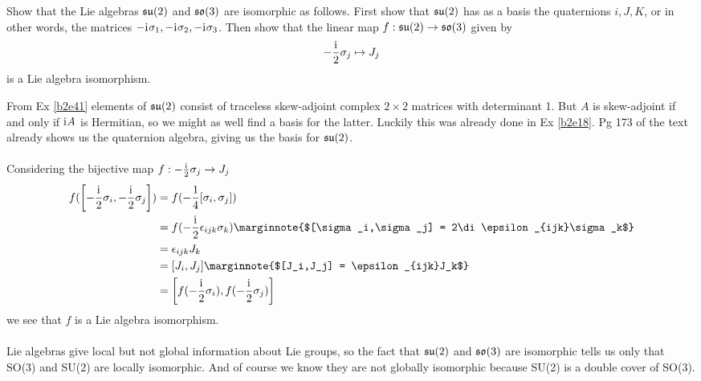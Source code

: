 \documentclass[10pt]{article}
\begin{document}
\begin{example}
	Show that the Lie algebras $\mathfrak{su}(2)$ and $\mathfrak{so}(3)$ are isomorphic as follows. First show that $\mathfrak{su}(2)$ has as a basis the quaternions $i,J,K$, or in other words, the matrices $-\mathrm{i}\mkern1mu\sigma_1, -\mathrm{i}\mkern1mu\sigma_2, -\mathrm{i}\mkern1mu\sigma_3$. Then show that the linear map $f:\mathfrak{su}(2)\to \mathfrak{so}(3)$ given by
	$$
	-\frac{\mathrm{i}\mkern1mu}{2}\sigma_j\mapsto J_j
	$$
	is a Lie algebra isomorphism.
\end{example}
\sol From Ex \ref{b2e41} elements of $\mathfrak{su}(2)$ consist of traceless skew-adjoint complex $2 \times 2$ matrices with determinant 1. But $A$ is skew-adjoint if and only if $\mathrm{i}\mkern1mu A$ is Hermitian, so we might as well find a basis for the latter. Luckily this was already done in Ex \ref{b2e18}. Pg 173 of the text already shows us the quaternion algebra, giving us the basis for $\mathfrak{su}(2)$.\\\\
Considering the bijective map $f:-\frac{\mathrm{i}\mkern1mu}{2}\sigma_j\to J_j$
$$
\begin{aligned}
	f(\sparen*{-\frac{\di}{2}\sigma_i,-\frac{\di}{2}\sigma_j}) &= f(-\frac14[\sigma_i,\sigma_j])\\
	&= f(-\frac{\di}{2}\epsilon_{ijk}\sigma_k)\marginnote{$[\sigma_i,\sigma_j] = 2\di\epsilon_{ijk}\sigma_k$}\\
	&= \epsilon_{ijk}J_k\\
	&= [J_i,J_j]\marginnote{$[J_i,J_j] = \epsilon_{ijk}J_k$}\\
	&= \sparen*{f(-\frac{\di}{2}\sigma_i),f(-\frac{\di}{2}\sigma_j)}
\end{aligned}
$$
we see that $f$ is a Lie algebra isomorphism.\\\\
Lie algebras give local but not global information about Lie groups, so the fact that $\mathfrak{su}(2)$ and $\mathfrak{so}(3)$ are isomorphic tells us only that SO(3) and SU(2) are locally isomorphic. And of course we know they are not globally isomorphic because SU(2) is a double cover of SO(3).
\end{document}
